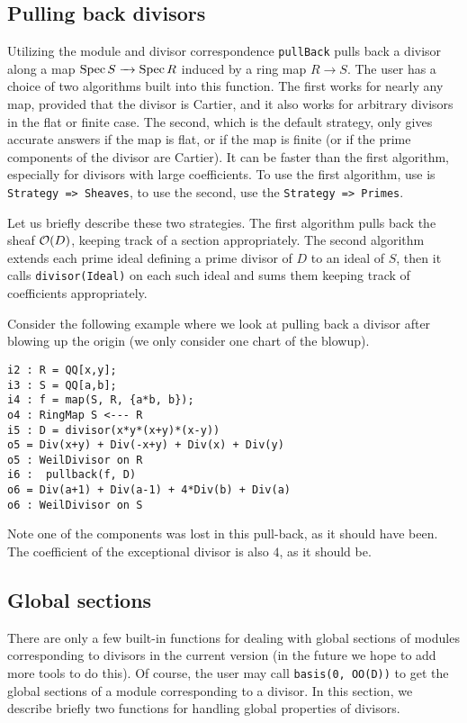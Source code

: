\documentclass[11pt]{amsart}
\begin{document}
\subsection{Pulling back divisors}

 Utilizing the module and divisor correspondence {\tt pullBack} pulls back a divisor along a map $\operatorname{{Spec}} S \xrightarrow{\ \ } \operatorname{{Spec}} R$ induced by a ring map $R \to S$.  The user has a choice of two algorithms built into this function.  The first works for nearly any map, provided that the divisor is Cartier, and it also works for arbitrary divisors in the flat or finite case.  The second, which is the default strategy, only gives accurate answers if the map is flat, or if the map is finite (or if the prime components of the divisor are Cartier).  It can be faster than the first algorithm, especially for divisors with large coefficients.  To use the first algorithm, use is {\tt Strategy => Sheaves}, to use the second, use the {\tt Strategy => Primes}.

Let us briefly describe these two strategies.  The first algorithm pulls back the sheaf $\mbox{$\mathcal{O}$}(D)$, keeping track of a section appropriately.
The second algorithm extends each prime ideal defining a prime divisor of $D$ to an ideal of $S$, then it calls {\tt divisor(Ideal)} on each such ideal and sums them keeping track of coefficients appropriately.

Consider the following example where we look at pulling back a divisor after blowing up the origin (we only consider one chart of the blowup).
\begin{verbatim}
i2 : R = QQ[x,y];
i3 : S = QQ[a,b];
i4 : f = map(S, R, {a*b, b});
o4 : RingMap S <--- R
i5 : D = divisor(x*y*(x+y)*(x-y))
o5 = Div(x+y) + Div(-x+y) + Div(x) + Div(y)
o5 : WeilDivisor on R
i6 :  pullback(f, D)
o6 = Div(a+1) + Div(a-1) + 4*Div(b) + Div(a)
o6 : WeilDivisor on S
\end{verbatim}
Note one of the components was lost in this pull-back, as it should have been.  The coefficient of the exceptional divisor is also $4$, as it should be.

\subsection{Global sections}

There are only a few built-in functions for dealing with global sections of modules corresponding to divisors in the current version (in the future we hope to add more tools to do this).  Of course, the user may call {\tt basis(0, OO(D))} to get the global sections of a module corresponding to a divisor.  In this section, we describe briefly two functions for handling global properties of divisors.
\end{document}
